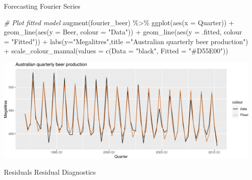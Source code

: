 \documentclass[
  ignorenonframetext,
]{beamer}
\newenvironment{Shaded}{\begin{snugshade}}{\end{snugshade}}
\newcommand{\AttributeTok}[1]{\textcolor[rgb]{0.77,0.63,0.00}{#1}}
\newcommand{\CommentTok}[1]{\textcolor[rgb]{0.56,0.35,0.01}{\textit{#1}}}
\newcommand{\FunctionTok}[1]{\textcolor[rgb]{0.00,0.00,0.00}{#1}}
\newcommand{\NormalTok}[1]{#1}
\newcommand{\SpecialCharTok}[1]{\textcolor[rgb]{0.00,0.00,0.00}{#1}}
\newcommand{\StringTok}[1]{\textcolor[rgb]{0.31,0.60,0.02}{#1}}
\begin{document}
\begin{frame}[fragile]{Forecasting \textbar{} \small Fourier Series}
\protect\hypertarget{forecasting-fourier-series-4}{}
\tiny

\begin{Shaded}
\begin{Highlighting}[]
\CommentTok{\# Plot fitted model}
\FunctionTok{augment}\NormalTok{(fourier\_beer) }\SpecialCharTok{\%\textgreater{}\%}
  \FunctionTok{ggplot}\NormalTok{(}\FunctionTok{aes}\NormalTok{(}\AttributeTok{x =}\NormalTok{ Quarter)) }\SpecialCharTok{+}
  \FunctionTok{geom\_line}\NormalTok{(}\FunctionTok{aes}\NormalTok{(}\AttributeTok{y =}\NormalTok{ Beer, }\AttributeTok{colour =} \StringTok{"Data"}\NormalTok{)) }\SpecialCharTok{+}
  \FunctionTok{geom\_line}\NormalTok{(}\FunctionTok{aes}\NormalTok{(}\AttributeTok{y =}\NormalTok{ .fitted, }\AttributeTok{colour =} \StringTok{"Fitted"}\NormalTok{)) }\SpecialCharTok{+}
  \FunctionTok{labs}\NormalTok{(}\AttributeTok{y=}\StringTok{"Megalitres"}\NormalTok{,}\AttributeTok{title =}\StringTok{"Australian quarterly beer production"}\NormalTok{) }\SpecialCharTok{+}
  \FunctionTok{scale\_colour\_manual}\NormalTok{(}\AttributeTok{values =} \FunctionTok{c}\NormalTok{(}\AttributeTok{Data =} \StringTok{"black"}\NormalTok{, }\AttributeTok{Fitted =} \StringTok{"\#D55E00"}\NormalTok{))}
\end{Highlighting}
\end{Shaded}

\includegraphics{Time-series-regression-models_files/figure-beamer/unnamed-chunk-54-1.pdf}

\normalfont
\end{frame}

\begin{frame}{Residuals}
\protect\hypertarget{residuals}{}
\center Residual Diagnostics
\end{frame}
\end{document}
